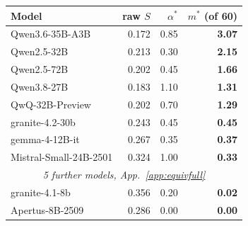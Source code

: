 \begin{tabular}{lrrr}
\toprule
Model & raw $S$ & $\alpha^{*}$ & $m^{*}$ (of 60)\\
\midrule
Qwen3.6-35B-A3B & 0.172 & 0.85 & \textbf{3.07}\\
Qwen2.5-32B & 0.213 & 0.30 & \textbf{2.15}\\
Qwen2.5-72B & 0.202 & 0.45 & \textbf{1.66}\\
Qwen3.8-27B & 0.183 & 1.10 & \textbf{1.31}\\
QwQ-32B-Preview & 0.202 & 0.70 & \textbf{1.29}\\
granite-4.2-30b & 0.243 & 0.45 & \textbf{0.45}\\
gemma-4-12B-it & 0.267 & 0.35 & \textbf{0.37}\\
Mistral-Small-24B-2501 & 0.324 & 1.00 & \textbf{0.33}\\
\midrule \multicolumn{4}{c}{\itshape 5 further models, App.~\ref{app:equivfull}}\\ \midrule
granite-4.1-8b & 0.356 & 0.20 & \textbf{0.02}\\
Apertus-8B-2509 & 0.286 & 0.00 & \textbf{0.00}\\
\bottomrule
\end{tabular}
